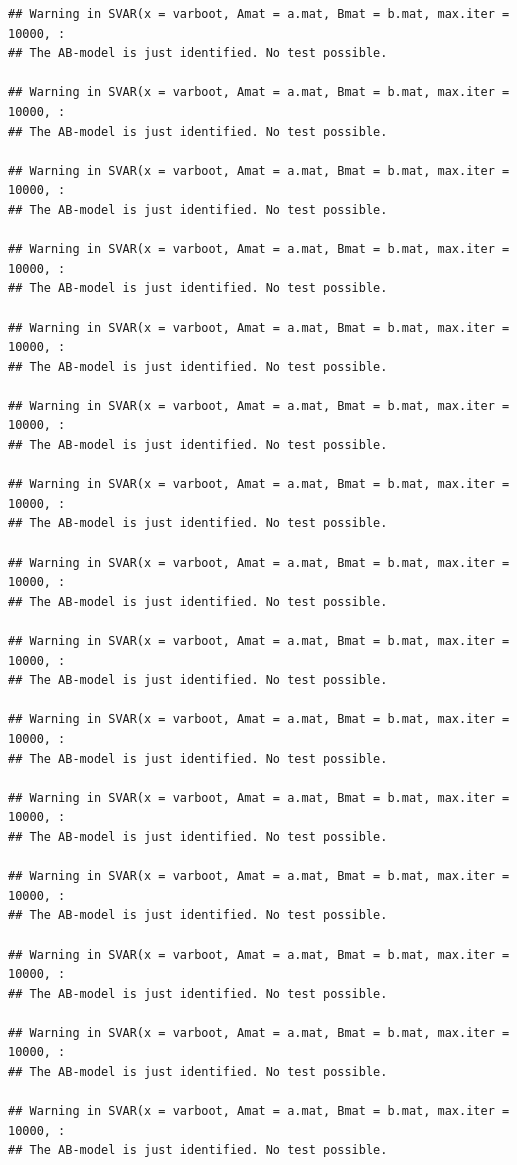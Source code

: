 \documentclass[
]{book}
\begin{document}
\begin{verbatim}
## Warning in SVAR(x = varboot, Amat = a.mat, Bmat = b.mat, max.iter = 10000, :
## The AB-model is just identified. No test possible.

## Warning in SVAR(x = varboot, Amat = a.mat, Bmat = b.mat, max.iter = 10000, :
## The AB-model is just identified. No test possible.

## Warning in SVAR(x = varboot, Amat = a.mat, Bmat = b.mat, max.iter = 10000, :
## The AB-model is just identified. No test possible.

## Warning in SVAR(x = varboot, Amat = a.mat, Bmat = b.mat, max.iter = 10000, :
## The AB-model is just identified. No test possible.

## Warning in SVAR(x = varboot, Amat = a.mat, Bmat = b.mat, max.iter = 10000, :
## The AB-model is just identified. No test possible.

## Warning in SVAR(x = varboot, Amat = a.mat, Bmat = b.mat, max.iter = 10000, :
## The AB-model is just identified. No test possible.

## Warning in SVAR(x = varboot, Amat = a.mat, Bmat = b.mat, max.iter = 10000, :
## The AB-model is just identified. No test possible.

## Warning in SVAR(x = varboot, Amat = a.mat, Bmat = b.mat, max.iter = 10000, :
## The AB-model is just identified. No test possible.

## Warning in SVAR(x = varboot, Amat = a.mat, Bmat = b.mat, max.iter = 10000, :
## The AB-model is just identified. No test possible.

## Warning in SVAR(x = varboot, Amat = a.mat, Bmat = b.mat, max.iter = 10000, :
## The AB-model is just identified. No test possible.

## Warning in SVAR(x = varboot, Amat = a.mat, Bmat = b.mat, max.iter = 10000, :
## The AB-model is just identified. No test possible.

## Warning in SVAR(x = varboot, Amat = a.mat, Bmat = b.mat, max.iter = 10000, :
## The AB-model is just identified. No test possible.

## Warning in SVAR(x = varboot, Amat = a.mat, Bmat = b.mat, max.iter = 10000, :
## The AB-model is just identified. No test possible.

## Warning in SVAR(x = varboot, Amat = a.mat, Bmat = b.mat, max.iter = 10000, :
## The AB-model is just identified. No test possible.

## Warning in SVAR(x = varboot, Amat = a.mat, Bmat = b.mat, max.iter = 10000, :
## The AB-model is just identified. No test possible.


\end{verbatim}
\end{document}
